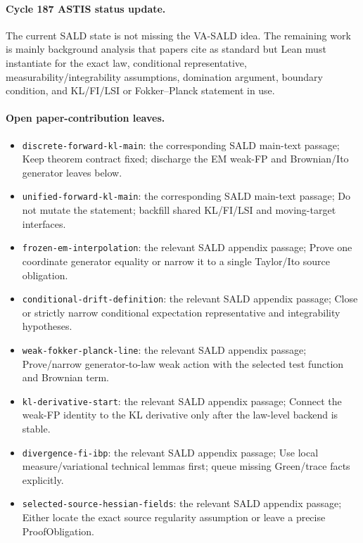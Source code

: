 \paragraph{Cycle 187 ASTIS status update.}
The current SALD state is not missing the VA-SALD idea.  The remaining work is mainly background analysis that papers cite as standard but Lean must instantiate for the exact law, conditional representative, measurability/integrability assumptions, domination argument, boundary condition, and KL/FI/LSI or Fokker--Planck statement in use.

\paragraph{Open paper-contribution leaves.}
\begin{itemize}
\item \texttt{discrete-forward-kl-main}: the corresponding SALD main-text passage; Keep theorem contract fixed; discharge the EM weak-FP and Brownian/Ito generator leaves below.
\item \texttt{unified-forward-kl-main}: the corresponding SALD main-text passage; Do not mutate the statement; backfill shared KL/FI/LSI and moving-target interfaces.
\item \texttt{frozen-em-interpolation}: the relevant SALD appendix passage; Prove one coordinate generator equality or narrow it to a single Taylor/Ito source obligation.
\item \texttt{conditional-drift-definition}: the relevant SALD appendix passage; Close or strictly narrow conditional expectation representative and integrability hypotheses.
\item \texttt{weak-fokker-planck-line}: the relevant SALD appendix passage; Prove/narrow generator-to-law weak action with the selected test function and Brownian term.
\item \texttt{kl-derivative-start}: the relevant SALD appendix passage; Connect the weak-FP identity to the KL derivative only after the law-level backend is stable.
\item \texttt{divergence-fi-ibp}: the relevant SALD appendix passage; Use local measure/variational technical lemmas first; queue missing Green/trace facts explicitly.
\item \texttt{selected-source-hessian-fields}: the relevant SALD appendix passage; Either locate the exact source regularity assumption or leave a precise ProofObligation.
\end{itemize}

